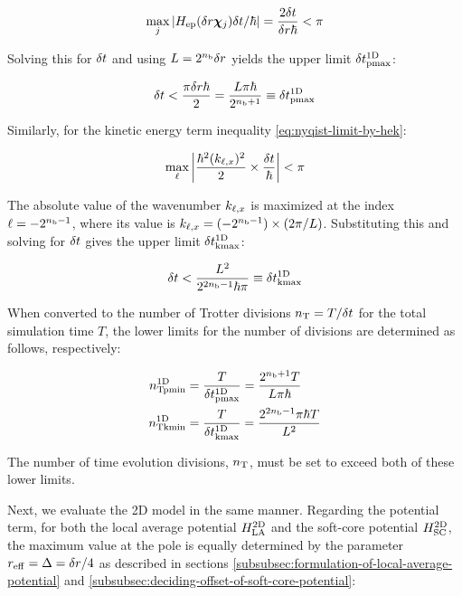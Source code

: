 \documentclass[jctc-draft.tex]{subfiles}
\begin{document}
\begin{equation}
\max_{j}{\left| H_{\mathrm{ep}}(\delta r\bm{\chi}_{j})\delta t/\hbar \right|} = \frac{2\delta t}{\delta r\hbar}<\pi
\end{equation}

Solving this for $\delta t$ and using $L=2^{n_{\mathrm{b}}}\delta r$ yields the upper limit $\delta t_{\mathrm{pmax}}^{\mathrm{1D}}$:

\begin{equation}
\delta t < \frac{\pi\delta r\hbar}{2}=\frac{L\pi\hbar}{2^{n_{\mathrm{b}}+1}}\equiv\delta t_{\mathrm{pmax}}^{\mathrm{1D}}
 \label{eq:nyqist-limit-by-hep-final}
\end{equation}

Similarly, for the kinetic energy term inequality \eqref{eq:nyqist-limit-by-hek}:

\begin{equation}
\max_{\ell}{\left| \frac{\hbar^2(k_{\ell,x})^2}{2}\times\frac{\delta t}{\hbar} \right|} < \pi
\label{eq:nyqist-limit-by-hek-maximum}
\end{equation}

The absolute value of the wavenumber $k_{\ell,x}$ is maximized at the index $\ell =
-2^{n_{\mathrm{b}}-1}$, where its value is $k_{\ell,x} = (-2^{n_{\mathrm{b}}-1})\times(2\pi/L)$.
Substituting this and solving for $\delta t$ gives the upper limit
$\delta t_{\mathrm{kmax}}^{\mathrm{1D}}$:

\begin{equation}
\delta t < \frac{L^2}{2^{2n_{\mathrm{b}}-1}\hbar\pi}\equiv\delta t_{\mathrm{kmax}}^{\mathrm{1D}}
 \label{eq:nyqist-limit-by-hek-final}
\end{equation}

When converted to the number of Trotter divisions $n_{\mathrm{T}} = T/\delta t$ for the
total simulation time $T$, the lower limits for the number of divisions are
determined as follows, respectively:

\begin{align}
    n_{\mathrm{Tpmin}}^{\mathrm{1D}} &= \frac{T}{\delta t_{\mathrm{pmax}}^{\mathrm{1D}}}=\frac{2^{n_{\mathrm{b}}+1}T}{L\pi\hbar}
    \label{eq:nT-pmin-definition}\\
    n_{\mathrm{Tkmin}}^{\mathrm{1D}} &= \frac{T}{\delta t_{\mathrm{kmax}}^{\mathrm{1D}}}=\frac{2^{2n_{\mathrm{b}}-1}\pi\hbar T}{L^2}
    \label{eq:nT-kmin-definition}
\end{align}

The number of time evolution divisions, $n_{\mathrm{T}}$, must be set to exceed both of these
lower limits.

Next, we evaluate the 2D model in the same manner. Regarding the potential term,
for both the local average potential $H_{\mathrm{LA}}^{\mathrm{2D}}$ and the soft-core potential
$H_{\mathrm{SC}}^{\mathrm{2D}}$, the maximum value at the pole is equally determined by the parameter
$r_{\mathrm{eff}}=\Delta=\delta r/4$ as described in sections
\ref{subsubsec:formulation-of-local-average-potential} and
\ref{subsubsec:deciding-offset-of-soft-core-potential}:
\end{document}
